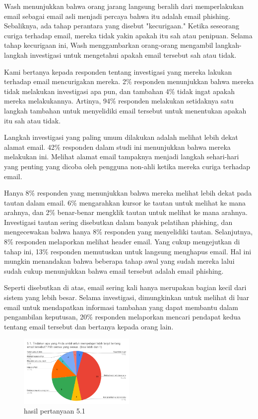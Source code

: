 \documentclass[lettersize,journal]{IEEEtran}
\begin{document}
Wash \cite{tigaempat} menunjukkan bahwa orang jarang langsung beralih dari
memperlakukan email sebagai email asli menjadi percaya bahwa itu adalah email
phishing. Sebaliknya, ada tahap perantara yang disebut "kecurigaan." Ketika
seseorang curiga terhadap email, mereka tidak yakin apakah itu sah atau
penipuan. Selama tahap kecurigaan ini, Wash \cite{tigaempat} menggambarkan
orang-orang mengambil langkah-langkah investigasi untuk mengetahui apakah email
tersebut sah atau tidak.

Kami bertanya kepada responden tentang investigasi yang mereka lakukan terhadap
email mencurigakan mereka. 2\% responden menunjukkan bahwa mereka tidak
melakukan investigasi apa pun, dan tambahan 4\% tidak ingat apakah mereka
melakukannya. Artinya, 94\% responden melakukan setidaknya satu langkah
tambahan untuk menyelidiki email tersebut untuk menentukan apakah itu sah atau
tidak.

Langkah investigasi yang paling umum dilakukan adalah melihat lebih dekat
alamat email. 42\% responden dalam studi ini menunjukkan bahwa mereka melakukan
ini. Melihat alamat email tampaknya menjadi langkah sehari-hari yang penting
yang dicoba oleh pengguna non-ahli ketika mereka curiga terhadap email.

Hanya 8\% responden yang menunjukkan bahwa mereka melihat lebih dekat pada
tautan dalam email. 6\% mengarahkan kursor ke tautan untuk melihat ke mana
arahnya, dan 2\% benar-benar mengklik tautan untuk melihat ke mana arahnya.
Investigasi tautan sering disebutkan dalam banyak pelatihan phishing, dan
mengecewakan bahwa hanya 8\% responden yang menyelidiki tautan.
Selanjutnya, 8\% responden melaporkan melihat header email. Yang cukup mengejutkan 
di tahap ini, 13\% responden memutuskan untuk langsung menghapus email. Hal ini 
mungkin menandakan bahwa beberapa tahap awal yang sudah mereka lalui sudah cukup 
menunjukkan bahwa email tersebut adalah email phishing.

Seperti disebutkan di atas, email sering kali hanya merupakan bagian kecil dari
sistem yang lebih besar. Selama investigasi, dimungkinkan untuk melihat di luar
email untuk mendapatkan informasi tambahan yang dapat membantu dalam
pengambilan keputusan, 20\% responden melaporkan
mencari pendapat kedua tentang email tersebut dan bertanya kepada orang lain.

\begin{figure}[h!]
  \centering
  \includegraphics[width=0.5\textwidth]{image/5.1.png}
  \caption{hasil pertanyaan 5.1}
  \label{fig:pertanyaan_5.1}
\end{figure}
\end{document}
